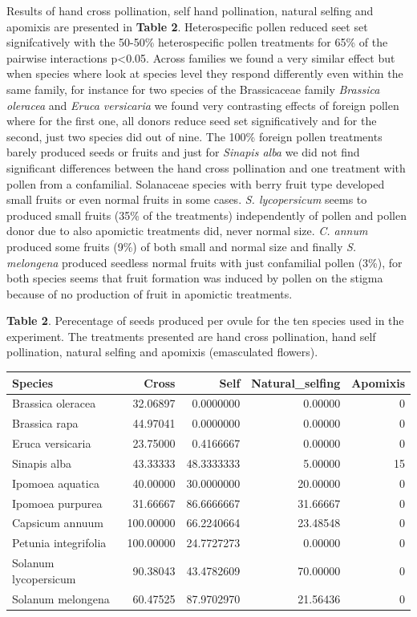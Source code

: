 \documentclass[11pt,a4paper]{article}
\begin{document}
Results of hand cross pollination, self hand pollination, natural
selfing and apomixis are presented in \textbf{Table 2}. Heterospecific
pollen reduced seet set signifcatively with the 50-50\% heterospecific
pollen treatments for 65\% of the pairwise interactions
p\textless{}0.05. Across families we found a very similar effect but
when species where look at species level they respond differently even
within the same family, for instance for two species of the Brassicaceae
family \emph{Brassica oleracea} and \emph{Eruca versicaria} we found
very contrasting effects of foreign pollen where for the first one, all
donors reduce seed set significatively and for the second, just two
species did out of nine. The 100\% foreign pollen treatments barely
produced seeds or fruits and just for \emph{Sinapis alba} we did not
find significant differences between the hand cross pollination and one
treatment with pollen from a confamilial. Solanaceae species with berry
fruit type developed small fruits or even normal fruits in some cases.
\emph{S. lycopersicum} seems to produced small fruits (35\% of the
treatments) independently of pollen and pollen donor due to also
apomictic treatments did, never normal size. \emph{C. annum} produced
some fruits (9\%) of both small and normal size and finally \emph{S.
melongena} produced seedless normal fruits with just confamilial pollen
(3\%), for both species seems that fruit formation was induced by pollen
on the stigma because of no production of fruit in apomictic treatments.

\textbf{Table 2}. Perecentage of seeds produced per ovule for the ten
species used in the experiment. The treatments presented are hand cross
pollination, hand self pollination, natural selfing and apomixis
(emasculated flowers).

\begin{longtable}[]{@{}lrrrr@{}}
\toprule
Species & Cross & Self & Natural\_selfing & Apomixis\tabularnewline
\midrule
\endhead
Brassica oleracea & 32.06897 & 0.0000000 & 0.00000 & 0\tabularnewline
Brassica rapa & 44.97041 & 0.0000000 & 0.00000 & 0\tabularnewline
Eruca versicaria & 23.75000 & 0.4166667 & 0.00000 & 0\tabularnewline
Sinapis alba & 43.33333 & 48.3333333 & 5.00000 & 15\tabularnewline
Ipomoea aquatica & 40.00000 & 30.0000000 & 20.00000 & 0\tabularnewline
Ipomoea purpurea & 31.66667 & 86.6666667 & 31.66667 & 0\tabularnewline
Capsicum annuum & 100.00000 & 66.2240664 & 23.48548 & 0\tabularnewline
Petunia integrifolia & 100.00000 & 24.7727273 & 0.00000 &
0\tabularnewline
Solanum lycopersicum & 90.38043 & 43.4782609 & 70.00000 &
0\tabularnewline
Solanum melongena & 60.47525 & 87.9702970 & 21.56436 & 0\tabularnewline
\bottomrule
\end{longtable}
\end{document}
